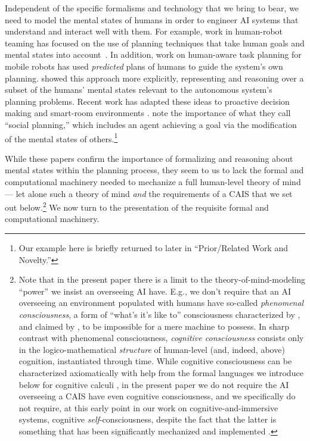 Independent of the specific formalisms and technology
that we bring to bear, we need to
model the mental states of humans in order to engineer AI
systems that understand and interact well with them.
For example, work in human-robot teaming has focused on
the use of planning techniques that take human goals and
mental states into account~\cite{briggs_multi-modal_2012}.
In addition, work on human-aware task planning for mobile robots
\cite{cirillo_human-aware_2009} has used \emph{predicted} plans of humans to
guide the system's own planning.
\cite{talamadupula_coordination_2014,chakraborti_planning_2015} showed this
approach more explicitly, representing and reasoning over a subset
of the humans' mental states relevant to the autonomous system's planning
problems.
Recent work has adapted these ideas to proactive decision making
\cite{sengupta_radar_2017,kim_towards_2017} and smart-room environments
\cite{chakraborti_mr._2017}.  \cite{pearce_etal_social_planning_aaai2014}
note the importance of what they call ``social planning,'' which
includes an agent achieving a goal via the modification of the mental
states of others.\footnote{Our example here is briefly returned
to later in ``Prior/Related Work and Novelty.''}

While these papers confirm the importance of formalizing and reasoning
about mental states within the planning process, they seem to us to lack the formal and
computational machinery needed to mechanize a full human-level theory
of mind --- let alone such a theory of mind \emph{and} the
requirements of a CAIS that we set out below.\footnote{Note that in
  the present paper there is a limit to the theory-of-mind-modeling
  ``power'' we insist an overseeing AI have.  E.g., we don't require
  that an AI overseeing an environment populated with humans have
  so-called \textit{phenomenal consciousness}, a form of ``what's it's
  like to'' consciousness characterized by \cite{bbs.block}, and
  claimed by \cite{sb_billion_conscious_robot}, to be impossible for a
  mere machine to possess.  In sharp contrast with phenomenal
  consciousness, \textit{cognitive consciousness} consists only in the
  logico-mathematical \emph{structure} of human-level (and, indeed,
  above) cognition, instantiated through time.  While cognitive
  consciousness can be characterized axiomatically with help from the
  formal languages we introduce below for cognitive calculi
  \cite{axiomatizing_consciousness1}, in the present paper we do not
  require the AI overseeing a CAIS have even cognitive consciousness,
  and we specifically do not require, at this early point in our work
  on cognitive-and-immersive systems, cognitive
  \emph{self}-consciousness, despite the fact that the latter is
  something that has been significantly mechanized and implemented
  \cite{roman2015_robot_self-con,sb_on_knowledge_game}.}  We now turn
to the presentation of the requisite formal and computational
machinery.